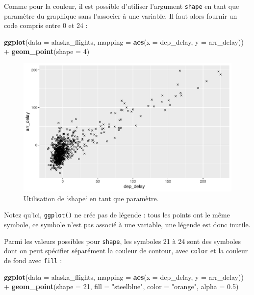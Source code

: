 \documentclass[
  a4paper,
]{article}
\newenvironment{Shaded}{\begin{snugshade}}{\end{snugshade}}
\newcommand{\DataTypeTok}[1]{\textcolor[rgb]{0.00,0.34,0.68}{#1}}
\newcommand{\DecValTok}[1]{\textcolor[rgb]{0.69,0.50,0.00}{#1}}
\newcommand{\FloatTok}[1]{\textcolor[rgb]{0.69,0.50,0.00}{#1}}
\newcommand{\KeywordTok}[1]{\textcolor[rgb]{0.12,0.11,0.11}{\textbf{#1}}}
\newcommand{\NormalTok}[1]{\textcolor[rgb]{0.12,0.11,0.11}{#1}}
\newcommand{\OperatorTok}[1]{\textcolor[rgb]{0.12,0.11,0.11}{#1}}
\newcommand{\StringTok}[1]{\textcolor[rgb]{0.75,0.01,0.01}{#1}}
\begin{document}
Comme pour la couleur, il est possible d'utiliser l'argument \texttt{shape} en tant que paramètre du graphique sans l'associer à une variable. Il faut alors fournir un code compris entre 0 et 24 :

\begin{Shaded}
\begin{Highlighting}[]
\KeywordTok{ggplot}\NormalTok{(}\DataTypeTok{data =}\NormalTok{ alaska_flights, }\DataTypeTok{mapping =} \KeywordTok{aes}\NormalTok{(}\DataTypeTok{x =}\NormalTok{ dep_delay, }\DataTypeTok{y =}\NormalTok{ arr_delay)) }\OperatorTok{+}
\StringTok{  }\KeywordTok{geom_point}\NormalTok{(}\DataTypeTok{shape =} \DecValTok{4}\NormalTok{)}
\end{Highlighting}
\end{Shaded}

\begin{figure}[htpb]

{\centering \includegraphics[width=0.9\linewidth]{figure/shapeplot2-1} 

}

\caption{Utilisation de `shape` en tant que paramètre.}\label{fig:shapeplot2}
\end{figure}

Notez qu'ici, \texttt{ggplot()} ne crée pas de légende : tous les points ont le même symbole, ce symbole n'est pas associé à une variable, une légende est donc inutile.

Parmi les valeurs possibles pour \texttt{shape}, les symboles 21 à 24 sont des symboles dont on peut spécifier séparément la couleur de contour, avec \texttt{color} et la couleur de fond avec \texttt{fill} :

\begin{Shaded}
\begin{Highlighting}[]
\KeywordTok{ggplot}\NormalTok{(}\DataTypeTok{data =}\NormalTok{ alaska_flights, }\DataTypeTok{mapping =} \KeywordTok{aes}\NormalTok{(}\DataTypeTok{x =}\NormalTok{ dep_delay, }\DataTypeTok{y =}\NormalTok{ arr_delay)) }\OperatorTok{+}
\StringTok{  }\KeywordTok{geom_point}\NormalTok{(}\DataTypeTok{shape =} \DecValTok{21}\NormalTok{, }\DataTypeTok{fill =} \StringTok{"steelblue"}\NormalTok{, }\DataTypeTok{color =} \StringTok{"orange"}\NormalTok{, }\DataTypeTok{alpha =} \FloatTok{0.5}\NormalTok{)}
\end{Highlighting}
\end{Shaded}
\end{document}
